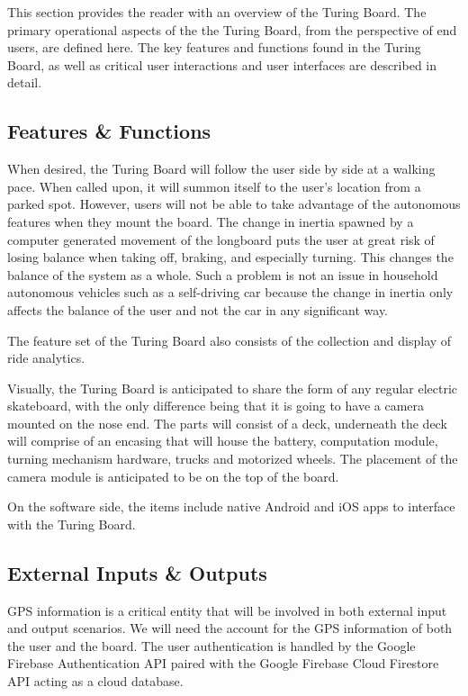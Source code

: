 This section provides the reader with an overview of the Turing Board. The primary operational aspects of the the Turing Board, from the perspective of end users, are defined here. The key features and functions found in the Turing Board, as well as critical user interactions and user interfaces are described in detail.

\subsection{Features \& Functions}
When desired, the Turing Board will follow the user side by side at a walking pace. When called upon, it will summon itself to the user's location from a parked spot. However, users will not be able to take advantage of the autonomous features when they mount the board. The change in inertia spawned by a computer generated movement of the longboard puts the user at great risk of losing balance when taking off, braking, and especially turning. This changes the balance of the system as a whole. Such a problem is not an issue in household autonomous vehicles such as a self-driving car because the change in inertia only affects the balance of the user and not the car in any significant way. 

The feature set of the Turing Board also consists of the collection and display of ride analytics.

Visually, the Turing Board is anticipated to share the form of any regular electric skateboard, with the only difference being that it is going to have a camera mounted on the nose end. The parts will consist of a deck, underneath the deck will comprise of an encasing that will house the battery, computation module, turning mechanism hardware, trucks and motorized wheels. The placement of the camera module is anticipated to be on the top of the board. 

On the software side, the items include native Android and iOS apps to interface with the Turing Board.

\subsection{External Inputs \& Outputs}
GPS information is a critical entity that will be involved in both external input and output scenarios. We will need the account for the GPS information of both the user and the board. The user authentication is handled by the Google Firebase Authentication API paired with the Google Firebase Cloud Firestore API acting as a cloud database. 

